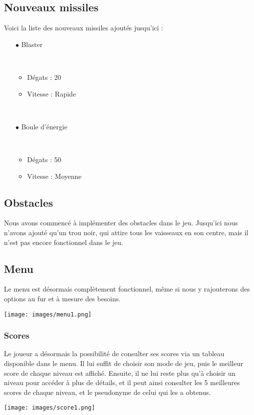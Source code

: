 \documentclass[12pt,a4paper]{article}
\begin{document}
		\newpage
		\subsection{Nouveaux missiles}
		Voici la liste des nouveaux missiles ajoutés jusqu'ici :
		\begin{itemize}
			\item[$\bullet$ Blaster]
				\par~
				\begin{itemize}
					\item Dégats : 20
					\item Vitesse : Rapide
				\end{itemize}
				\par~
			\item[$\bullet$ Boule d'énergie]
				\par~
				\begin{itemize}
					\item Dégats : 50
					\item Vitesse : Moyenne
				\end{itemize}
		\end{itemize}
		\subsection{Obstacles}		
		\par 
		Nous avons commencé à implémenter des obstacles dans le jeu. Jusqu'ici nous n'avons ajouté qu'un trou noir, qui attire tous les vaisseaux en son centre, mais il n'est pas encore fonctionnel dans le jeu.
		\subsection{Menu}
		\par
		Le menu est désormais complètement fonctionnel, même si nous y rajouterons des options au fur et à mesure des besoins.
		\begin{center}
		\vspace{0.5cm}
		\texttt{[image: images/menu1.png]}
		\end{center}
		\newpage
		\subsubsection{Scores}
		\par
		Le joueur a désormais la possibilité de consulter ses scores via un tableau disponible dans le menu.
		Il lui suffit de choisir son mode de jeu, puis le meilleur score de chaque niveau est affiché.
		Ensuite, il ne lui reste plus qu'à choisir un niveau pour accéder à plus de détails, et il peut ainsi consulter les 5 meilleures scores de chaque niveau, et le pseudonyme de celui qui les a obtenus.
		\begin{center}
		\vspace{1cm}
		\texttt{[image: images/score1.png]}
		\vspace{1cm}
		\end{center}
		
\end{document}
